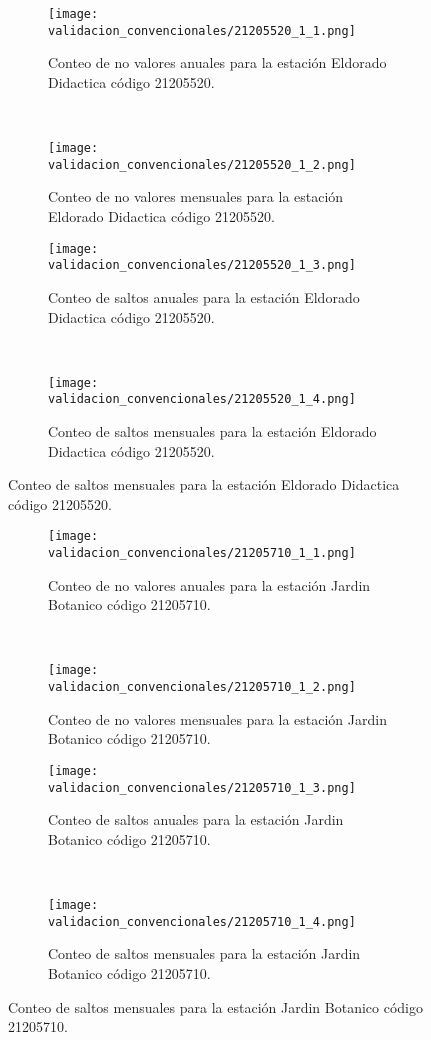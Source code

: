 \begin{figure}[H]\ContinuedFloat
\centering
	\begin{subfigure}[normla]{0.4\textwidth}
	\texttt{[image: validacion\_convencionales/21205520\_1\_1.png]}
		\caption{Conteo de no valores anuales para la estación Eldorado Didactica código 21205520.}
		\label{subfig:a1}
		\end{subfigure}
		~
    \begin{subfigure}[normla]{0.4\textwidth}
	\texttt{[image: validacion\_convencionales/21205520\_1\_2.png]}
		\caption{Conteo de no valores mensuales para la estación Eldorado Didactica código 21205520.}
		\label{subfig:a2}
		\end{subfigure}
		
    \begin{subfigure}[normla]{0.4\textwidth}
	\texttt{[image: validacion\_convencionales/21205520\_1\_3.png]}
		\caption{Conteo de saltos anuales para la estación Eldorado Didactica código 21205520.}
		\label{subfig:a1}
		\end{subfigure}
		~
    \begin{subfigure}[normla]{0.4\textwidth}
	\texttt{[image: validacion\_convencionales/21205520\_1\_4.png]}
		\caption{Conteo de saltos mensuales para la estación Eldorado Didactica código 21205520.}
		\label{subfig:a2}
		\end{subfigure}

	
\end{figure}
           
\begin{figure}[H]\ContinuedFloat
\centering
	\begin{subfigure}[normla]{0.4\textwidth}
	\texttt{[image: validacion\_convencionales/21205710\_1\_1.png]}
		\caption{Conteo de no valores anuales para la estación Jardin Botanico código 21205710.}
		\label{subfig:a1}
		\end{subfigure}
		~
    \begin{subfigure}[normla]{0.4\textwidth}
	\texttt{[image: validacion\_convencionales/21205710\_1\_2.png]}
		\caption{Conteo de no valores mensuales para la estación Jardin Botanico código 21205710.}
		\label{subfig:a2}
		\end{subfigure}
		
    \begin{subfigure}[normla]{0.4\textwidth}
	\texttt{[image: validacion\_convencionales/21205710\_1\_3.png]}
		\caption{Conteo de saltos anuales para la estación Jardin Botanico código 21205710.}
		\label{subfig:a1}
		\end{subfigure}
		~
    \begin{subfigure}[normla]{0.4\textwidth}
	\texttt{[image: validacion\_convencionales/21205710\_1\_4.png]}
		\caption{Conteo de saltos mensuales para la estación Jardin Botanico código 21205710.}
		\label{subfig:a2}
		\end{subfigure}

	
\end{figure}
           
